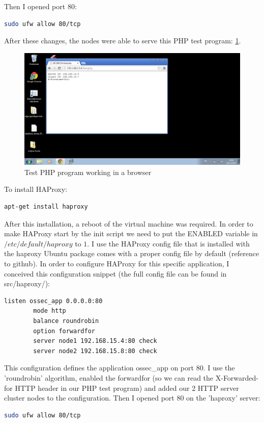 \documentclass[12pt]{report}
\begin{document}
Then I opened port 80:
\begin{lstlisting}[language=bash]
  sudo ufw allow 80/tcp
\end{lstlisting} 

After these changes, the nodes were able to serve this PHP test
program: \ref{fig:test_php_working}.

\begin{figure}[h!]
  \caption{Test PHP program working in a browser}
  \label{fig:test_php_working}
  \centering
    \includegraphics[scale=0.3]{pics/test_php_working.png}
\end{figure}

To install HAProxy:
\begin{lstlisting}[language=bash]
apt-get install haproxy
\end{lstlisting} 
After this installation, a reboot of the virtual machine was required.
In order to make HAProxy start by the init script we need to put the
ENABLED variable in $/etc/default/haproxy$ to $1$.
I use the HAProxy config file that is installed with the haproxy
Ubuntu package comes with a proper config file by default (reference
to github).   
In order to configure HAProxy for this specific application, I conceived
this configuration snippet (the full config file can be found in src/haproxy/):
\begin{lstlisting}[language=bash]
listen ossec_app 0.0.0.0:80
        mode http
        balance roundrobin
        option forwardfor
        server node1 192.168.15.4:80 check
        server node2 192.168.15.8:80 check
\end{lstlisting} 
This configuration defines the application ossec\_app on port 80.
I use the 'roundrobin' algorithm, enabled the forwardfor (so we can read
the X-Forwarded-for HTTP header in our PHP test program) and added our 2
HTTP server cluster nodes to the configuration.
Then I opened port 80 on the 'haproxy' server:
\begin{lstlisting}[language=bash]
  sudo ufw allow 80/tcp
\end{lstlisting} 
\end{document}
